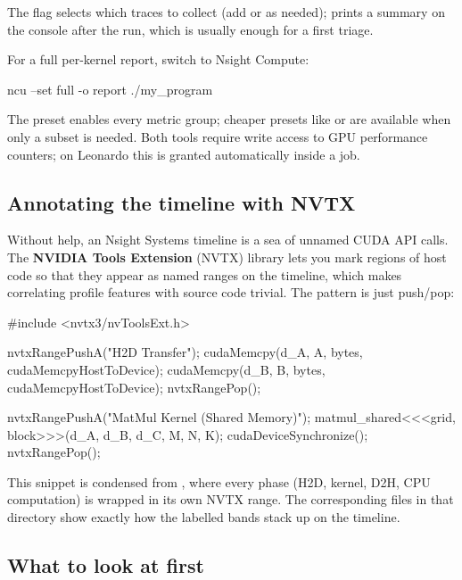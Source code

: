 The  flag selects which traces to collect (add  or  as needed);  prints a summary on the console after the run, which is usually enough for a first triage.

For a full per-kernel report, switch to Nsight Compute:

\begin{codeblock}[language=bash]
ncu --set full -o report ./my_program
\end{codeblock}

The  preset enables every metric group; cheaper presets like  or  are available when only a subset is needed. Both tools require write access to GPU performance counters; on Leonardo this is granted automatically inside a  job.

\subsection{Annotating the timeline with NVTX}

Without help, an Nsight Systems timeline is a sea of unnamed CUDA API calls. The \textbf{NVIDIA Tools Extension} (NVTX) library lets you mark regions of host code so that they appear as named ranges on the timeline, which makes correlating profile features with source code trivial. The pattern is just push/pop:

\begin{codeblock}[language=C]
#include <nvtx3/nvToolsExt.h>

nvtxRangePushA("H2D Transfer");
cudaMemcpy(d_A, A, bytes, cudaMemcpyHostToDevice);
cudaMemcpy(d_B, B, bytes, cudaMemcpyHostToDevice);
nvtxRangePop();

nvtxRangePushA("MatMul Kernel (Shared Memory)");
matmul_shared<<<grid, block>>>(d_A, d_B, d_C, M, N, K);
cudaDeviceSynchronize();
nvtxRangePop();
\end{codeblock}

This snippet is condensed from , where every phase (H2D, kernel, D2H, CPU computation) is wrapped in its own NVTX range. The corresponding  files in that directory show exactly how the labelled bands stack up on the timeline.

\subsection{What to look at first}

